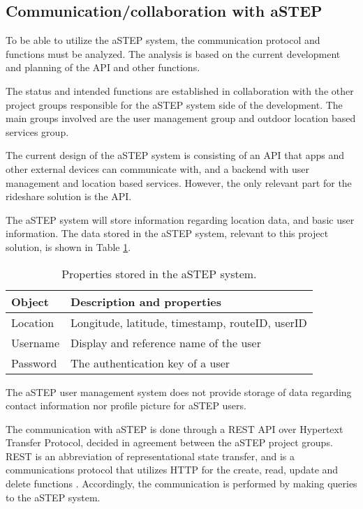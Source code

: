 \subsection{Communication/collaboration with aSTEP}
To be able to utilize the aSTEP system, the communication protocol and functions must be analyzed. 
The analysis is based on the current development and planning of the API and other functions.

The status and intended functions are established in collaboration with the other project groups responsible for the aSTEP system side of the development. 
The main groups involved are the user management group and outdoor location based services group.

The current design of the aSTEP system is consisting of an API that apps and other external devices can communicate with, and a backend with user management and location based services.
However, the only relevant part for the rideshare solution is the API.

The aSTEP system will store information regarding location data, and basic user information. 
The data stored in the aSTEP system, relevant to this project solution, is shown in Table \ref{tab:storedinastep}.

\begin{table}[h]
	\centering
	\begin{tabular}{l|l}
		Object & Description and properties \\
		\hline
		Location & Longitude, latitude, timestamp, routeID, userID \\
		Username & Display and reference name of the user \\
		Password & The authentication key of a user
	\end{tabular}
	\caption{Properties stored in the aSTEP system.}
	\label{tab:storedinastep}
\end{table}

The aSTEP user management system does not provide storage of data regarding contact information nor profile picture for aSTEP users. 


The communication with aSTEP is done through a REST API over Hypertext Transfer Protocol, decided in agreement between the aSTEP project groups.
REST is an abbreviation of representational state transfer, and is a communications protocol that utilizes HTTP for the create, read, update and delete functions \cite{REST}.
Accordingly, the communication is performed by making queries to the aSTEP system. 



